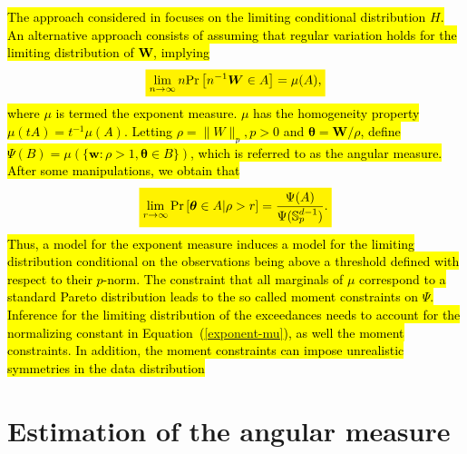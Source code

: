 \documentclass[iicol,sn-basic]{sn-jnl}
\newcommand{\mathcolorbox}[2]{\colorbox{#1}{$\displaystyle #2$}}
\newcommand{\prob}[1]{\text{Pr}\left[#1\right]}
\theoremstyle{thmstyleone}
\begin{document}
\hl{The approach considered in \mbox{\cite{rootzen2018}} focuses on the limiting conditional distribution $H$. An alternative approach consists of assuming that regular variation \mbox{\cite[see, for example,][]{resnick2008extreme}} holds for the limiting distribution of $\bm{W}$, implying}
\[
\mathcolorbox{yellow}{\lim\limits_{n\rightarrow\infty} n \prob{n^{-1} \bm{W}\in A} = \mu(A),}
\]
\hl{where $\mu$ is termed the exponent measure. $\mu$ has the homogeneity property $\mu(tA) = t^{-1}\mu(A)$. Letting $\rho = \|W\|_p, p>0$ and $\bm{\theta} = \bm{W}/\rho$, define  $\Psi(B) = \mu(\{\bm{w} : \rho>1, \bm{\theta} \in B\})$, which is referred to as the angular measure. After some manipulations, we obtain that}
\begin{equation}
\label{exponent-mu}
\mathcolorbox{yellow}{\lim\limits_{r\rightarrow\infty}\text{Pr}\left[\bm{\theta}\in A \rvert \rho>r\right] =\frac{\Psi(A)}{\Psi({\mathbb S}_p^{d-1})}.}
\end{equation}
\hl{Thus, a model for the exponent measure induces a model for the limiting distribution conditional on the observations being above a threshold defined with respect to their $p$-norm. The constraint that all marginals of $\mu$ correspond to a standard Pareto distribution leads to the so called moment constraints on $\Psi$. Inference for the limiting distribution of the exceedances needs to account for the normalizing constant in Equation~(\mbox{\ref{exponent-mu}}), as well the moment constraints. In addition, the moment constraints can impose unrealistic symmetries in the data distribution}

\section{Estimation of the angular measure\label{sec:methodology}}
\end{document}
